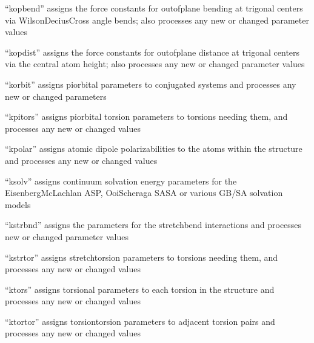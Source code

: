\documentclass[letterpaper,11pt,english]{sphinxmanual}
\begin{document}
“kopbend” assigns the force constants for out\sphinxhyphen{}of\sphinxhyphen{}plane bending at trigonal centers via Wilson\sphinxhyphen{}Decius\sphinxhyphen{}Cross angle bends; also processes any new or changed parameter values


“kopdist” assigns the force constants for out\sphinxhyphen{}of\sphinxhyphen{}plane distance at trigonal centers via the central atom height; also processes any new or changed parameter values


“korbit” assigns pi\sphinxhyphen{}orbital parameters to conjugated systems and processes any new or changed parameters


“kpitors” assigns pi\sphinxhyphen{}orbital torsion parameters to torsions needing them, and processes any new or changed values


“kpolar” assigns atomic dipole polarizabilities to the atoms within the structure and processes any new or changed values


“ksolv” assigns continuum solvation energy parameters for the Eisenberg\sphinxhyphen{}McLachlan ASP, Ooi\sphinxhyphen{}Scheraga SASA or various GB/SA solvation models


“kstrbnd” assigns the parameters for the stretch\sphinxhyphen{}bend interactions and processes new or changed parameter values


“kstrtor” assigns stretch\sphinxhyphen{}torsion parameters to torsions needing them, and processes any new or changed values


“ktors” assigns torsional parameters to each torsion in the structure and processes any new or changed values


“ktortor” assigns torsion\sphinxhyphen{}torsion parameters to adjacent torsion pairs and processes any new or changed values

\end{document}
